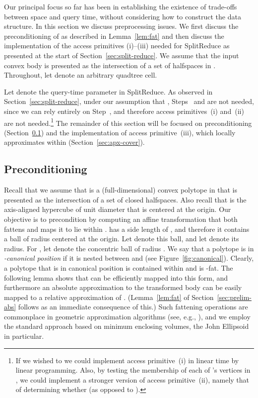 \documentclass[11pt]{article}   \usepackage[letterpaper,hmargin=2.1cm,vmargin=3cm]{geometry}
\newcommand{\alg}{\textrm{SplitReduce}}
\begin{document}
Our principal focus so far has been in establishing the existence of trade-offs between space and query time, without considering how to construct the data structure. In this section we discuss preprocessing issues. We first discuss the preconditioning of  as described in Lemma~\ref{lem:fat} and then discuss the implementation of the access primitives (i)--(iii) needed for {\alg} as presented at the start of Section~\ref{sec:split-reduce}. We assume that the input convex body  is presented as the intersection of a set  of  halfspaces in . Throughout, let  denote an arbitrary quadtree cell.

Let  denote the query-time parameter in {\alg}. As observed in Section~\ref{sec:split-reduce}, under our assumption that , Steps~{\stepout} and {\stepin} are not needed, since we can rely entirely on Step~{\stepapx}, and therefore access primitives~(i) and~(ii) are not needed.\footnote{If we wished to we could implement access primitive~(i) in linear time by linear programming. Also, by testing the membership of each of 's vertices in , we could implement a stronger version of access primitive~(ii), namely that of determining whether  (as opposed to ).}
The remainder of this section will be focused on preconditioning (Section~\ref{sec:precondition}) and the implementation of access primitive~(iii), which locally approximates  within  (Section~\ref{sec:apx-cover}).

\subsection{Preconditioning} \label{sec:precondition}


Recall that we assume that  is a (full-dimensional) convex polytope in  that is presented as the intersection of a set of  closed halfspaces. Also recall that  is the axis-aligned hypercube of unit diameter that is centered at the origin. Our objective is to precondition  by computing an affine transformation that both fattens  and maps it to lie within .  has a side length of , and therefore it contains a ball of radius  centered at the origin. Let  denote this ball, and let  denote its radius. For , let  denote the concentric ball of radius . We say that a polytope is in \emph{-canonical position} if it is nested between  and  (see Figure~\ref{fig:canonical}). Clearly, a polytope that is in canonical position is contained within  and is -fat. The following lemma shows that  can be efficiently mapped into this form, and furthermore an absolute approximation to the transformed body can be easily mapped to a relative approximation of . (Lemma~\ref{lem:fat} of Section~\ref{sec:prelim-abs} follows as an immediate consequence of this.) Such fattening operations are commonplace in geometric approximation algorithms (see, e.g., \cite{AHV-coreset,Chan-coreset,HP-book,BHP-bbox}), and we employ the standard approach based on minimum enclosing volumes, the John Ellipsoid in particular. 
\end{document}
